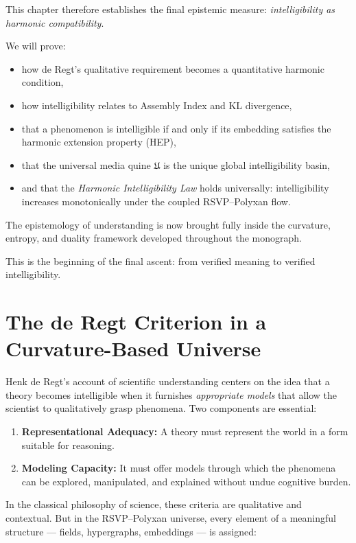 This chapter therefore establishes the final epistemic measure:
\emph{intelligibility as harmonic compatibility}.

We will prove:

\begin{itemize}
\item how de Regt’s qualitative requirement becomes a quantitative harmonic condition,
\item how intelligibility relates to Assembly Index and KL divergence,
\item that a phenomenon is intelligible if and only if its embedding satisfies
      the harmonic extension property (HEP),
\item that the universal media quine $\mathfrak{U}$ is the unique global
      intelligibility basin,
\item and that the \emph{Harmonic Intelligibility Law} holds universally:
      intelligibility increases monotonically under the coupled RSVP--Polyxan flow.
\end{itemize}

The epistemology of understanding is now brought fully inside the curvature,
entropy, and duality framework developed throughout the monograph.

This is the beginning of the final ascent:
from verified meaning to verified intelligibility.

\section{The de Regt Criterion in a Curvature-Based Universe}

Henk de Regt’s account of scientific understanding centers on the idea that
a theory becomes intelligible when it furnishes \emph{appropriate models}
that allow the scientist to qualitatively grasp phenomena.  
Two components are essential:

\begin{enumerate}
\item \textbf{Representational Adequacy:}  
      A theory must represent the world in a form suitable for reasoning.

\item \textbf{Modeling Capacity:}  
      It must offer models through which the phenomena can be explored,
      manipulated, and explained without undue cognitive burden.
\end{enumerate}

In the classical philosophy of science, these criteria are qualitative and
contextual.  
But in the RSVP--Polyxan universe, every element of a meaningful structure —
fields, hypergraphs, embeddings — is assigned:

